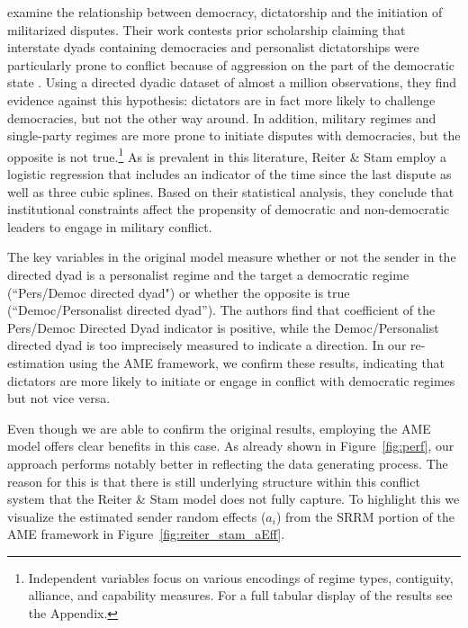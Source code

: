\citet{reiter:stam:2003} examine the relationship between democracy, dictatorship and the initiation of militarized disputes. Their work contests prior scholarship claiming that interstate dyads containing democracies and personalist dictatorships were particularly prone to conflict because of aggression on the part of the democratic state \citep{peceny:etal:2002}. Using a directed dyadic dataset of almost a million observations, they find evidence against this hypothesis: dictators are in fact more likely to challenge democracies, but not the other way around. In addition, military regimes and single-party regimes are more prone to initiate disputes with democracies, but the opposite is not true.\footnote{Independent variables focus on various encodings of regime types, contiguity, alliance, and capability measures. For a full tabular display of the results see the Appendix.} As is prevalent in this literature, Reiter \& Stam employ a logistic regression that includes an indicator of the time since the last dispute as well as three cubic splines. Based on their statistical analysis, they conclude that institutional constraints affect the propensity of democratic and non-democratic leaders to engage in military conflict. 

The key variables in the original model measure whether or not the sender in the directed dyad is a personalist regime and the target a democratic regime (``Pers/Democ directed dyad") or whether the opposite is true (``Democ/Personalist directed dyad''). The authors find that coefficient of the Pers/Democ Directed Dyad indicator is positive, while the Democ/Personalist directed dyad is too imprecisely measured to indicate a direction. In our re-estimation using the AME framework, we confirm these results, indicating that dictators are more likely to initiate or engage in conflict with democratic regimes but not vice versa. 

Even though we are able to confirm the original results, employing the AME model offers clear benefits in this case. As already shown in Figure~\ref{fig:perf}, our approach performs notably better in reflecting the data generating process. The reason for this is that there is still underlying structure within this conflict system that the Reiter \& Stam model does not fully capture. To highlight this we visualize the estimated sender random effects ($a_{i}$) from the SRRM portion of the AME framework in Figure~\ref{fig:reiter_stam_aEff}. 

